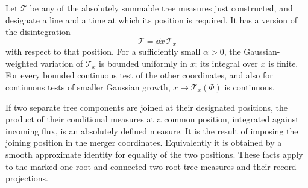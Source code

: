 \begin{lemma}\label{lem:sharp-spatial-traces}
Let \(\mathcal T\) be any of the absolutely summable tree measures
just constructed, and designate a line and a time at which its
position is required.  It has a version of the disintegration
\begin{equation}\label{eq:sharp-disintegration}
               \mathcal T=\dd x\,\mathcal T_x
\end{equation}
with respect to that position.  For a sufficiently small
\(\alpha>0\), the Gaussian-weighted variation of
\(\mathcal T_x\) is bounded uniformly in \(x\); its integral over
\(x\) is finite.  For every bounded continuous test of the other
coordinates, and also for continuous tests of smaller Gaussian
growth, \(x\mapsto\mathcal T_x(\Phi)\) is continuous.

If two separate tree components are joined at their designated
positions, the product of their conditional measures at a common
position, integrated against incoming flux, is an absolutely
defined measure.  It is the result of imposing the joining
position in the merger coordinates.  Equivalently it is obtained
by a smooth approximate identity for equality of the two
positions.  These facts apply to the marked one-root and
connected two-root tree measures and their record projections.
\end{lemma}

